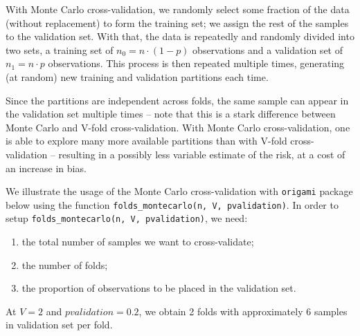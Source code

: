 \documentclass[12pt, krantz2,]{krantz}
\providecommand{\tightlist}{%
  \setlength{\itemsep}{0pt}\setlength{\parskip}{0pt}}
\theoremstyle{definition}
\theoremstyle{definition}
\theoremstyle{definition}
\newcommand{\1}{\mathbbm{1}}
\begin{document}
With Monte Carlo cross-validation, we randomly select some fraction of the data
(without replacement) to form the training set; we assign the rest of the
samples to the validation set. With that, the data is repeatedly and randomly
divided into two sets, a training set of \(n_0 = n \cdot (1-p)\) observations and
a validation set of \(n_1 = n \cdot p\) observations. This process is then
repeated multiple times, generating (at random) new training and validation
partitions each time.

Since the partitions are independent across folds, the same sample can appear in
the validation set multiple times -- note that this is a stark difference
between Monte Carlo and V-fold cross-validation. With Monte Carlo
cross-validation, one is able to explore many more available partitions than
with V-fold cross-validation -- resulting in a possibly less variable estimate
of the risk, at a cost of an increase in bias.

We illustrate the usage of the Monte Carlo cross-validation with \texttt{origami}
package below using the function \texttt{folds\_montecarlo(n,\ V,\ pvalidation)}. In order
to setup \texttt{folds\_montecarlo(n,\ V,\ pvalidation)}, we need:

\begin{enumerate}
\def\labelenumi{\arabic{enumi}.}
\tightlist
\item
  the total number of samples we want to cross-validate;
\item
  the number of folds;
\item
  the proportion of observations to be placed in the validation set.
\end{enumerate}

At \(V=2\) and \(pvalidation=0.2\), we obtain 2 folds with approximately \(6\) samples
in validation set per fold.
\end{document}
